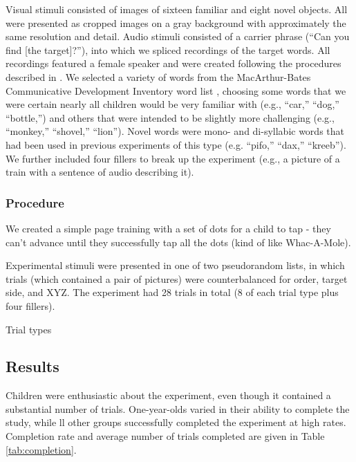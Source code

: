 \documentclass[man,noapacite]{apa2}
\begin{document}
Visual stimuli consisted of images of sixteen familiar and eight novel objects. All were presented as cropped images on a gray background with approximately the same resolution and detail.  Audio stimuli consisted of a carrier phrase (``Can you find [the target]?''), into which we spliced recordings of the target words. All recordings featured a female speaker and were created following the procedures described in . We selected a variety of words from the MacArthur-Bates Communicative Development Inventory word list \cite{fenson1994,fenson2007}, choosing some words that we were certain nearly all children would be very familiar with (e.g., ``car,'' ``dog,'' ``bottle,'') and others that were intended to be slightly more challenging (e.g., ``monkey,'' ``shovel,'' ``lion''). Novel words were mono- and di-syllabic words that had been used in previous experiments of this type (e.g. ``pifo,'' ``dax,'' ``kreeb''). We further included four fillers to break up the experiment (e.g., a picture of a train with a sentence of audio describing it).

\subsubsection{Procedure}

We created a simple page training with a set of dots for a child to tap - they can't advance until they successfully tap all the dots (kind of like Whac-A-Mole).

Experimental stimuli were presented in one of two pseudorandom lists, in which trials (which contained a pair of pictures) were counterbalanced for order, target side, and XYZ. The experiment had 28 trials in total (8 of each trial type plus four fillers). 

Trial types

\subsection{Results}


Children were enthusiastic about the experiment, even though it contained a substantial number of trials. One-year-olds varied in their ability to complete the study, while ll other groups successfully completed the experiment at high rates. Completion rate and average number of trials completed are given in Table \ref{tab:completion}.
\end{document}
